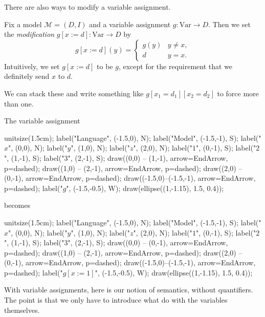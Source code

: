 There are also ways to modify a variable assignment.
\begin{definition}
	Fix a model $\mathcal M=(D,I)$ and a variable assignment $g:\mathrm{Var}\to D$. Then we set the \textit{modification} $g[x:=d]:\mathrm{Var}\to D$ by
	\[g[x:=d](y)=\begin{cases}
		g(y) & y\ne x, \\
		d & y=x.
	\end{cases}\]
	Intuitively, we set $g[x:=d]$ to be $g$, except for the requirement that we definitely send $x$ to $d$.
\end{definition}
\begin{remark}
	We can stack these and write something like $g[x_1=d_1][x_2=d_2]$ to force more than one.
\end{remark}
\begin{example}
	The variable assignment
	\begin{center}
		\begin{asy}
			unitsize(1.5cm);
			label("Language", (-1.5,0), N);
			label("Model", (-1.5,-1), S);
			label("$x$", (0,0), N);
			label("$y$", (1,0), N);
			label("$z$", (2,0), N);
			label("$1$", (0,-1), S);
			label("$2$", (1,-1), S);
			label("$3$", (2,-1), S);
			draw((0,0) -- (1,-1), arrow=EndArrow, p=dashed);
			draw((1,0) -- (2,-1), arrow=EndArrow, p=dashed);
			draw((2,0) -- (0,-1), arrow=EndArrow, p=dashed);
			draw((-1.5,0)--(-1.5,-1), arrow=EndArrow, p=dashed);
			label("$g$", (-1.5,-0.5), W);
			draw(ellipse((1,-1.15), 1.5, 0.4));
		\end{asy}
	\end{center}
	becomes
	\begin{center}
		\begin{asy}
			unitsize(1.5cm);
			label("Language", (-1.5,0), N);
			label("Model", (-1.5,-1), S);
			label("$x$", (0,0), N);
			label("$y$", (1,0), N);
			label("$z$", (2,0), N);
			label("$1$", (0,-1), S);
			label("$2$", (1,-1), S);
			label("$3$", (2,-1), S);
			draw((0,0) -- (0,-1), arrow=EndArrow, p=dashed);
			draw((1,0) -- (2,-1), arrow=EndArrow, p=dashed);
			draw((2,0) -- (0,-1), arrow=EndArrow, p=dashed);
			draw((-1.5,0)--(-1.5,-1), arrow=EndArrow, p=dashed);
			label("$g[x:=1]$", (-1.5,-0.5), W);
			draw(ellipse((1,-1.15), 1.5, 0.4));
		\end{asy}
	\end{center}
\end{example}
With variable assignments, here is our notion of semantics, without quantifiers. The point is that we only have to introduce what do with the variables themselves.
